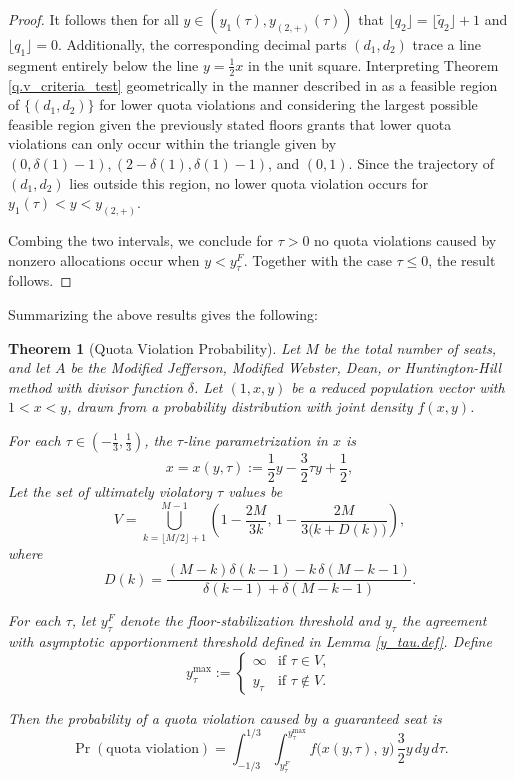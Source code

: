 \documentclass[11pt]{article}
\newtheorem{theorem}{Theorem}[section]
\theoremstyle{definition}
\theoremstyle{definition}
\begin{document}
\begin{proof}
It follows then for all $y \in (y_1(\tau), y_{(2,+)}(\tau))$ that $\lfloor q_2 \rfloor =\lfloor \tilde q_2 \rfloor + 1$ and $\lfloor q_1 \rfloor = 0$. Additionally, the corresponding decimal parts $(d_1, d_2)$ trace a line segment entirely below the line $y = \frac{1}{2} x$ in the unit square. Interpreting Theorem \ref{q.v_criteria_test} geometrically in the manner described in \parencite{Self} as a feasible region of $\{(d_1, d_2)\}$ for lower quota violations and considering the largest possible feasible region given the previously stated floors grants that lower quota violations can only occur within the triangle given by $(0, \delta(1)-1), (2-\delta(1), \delta(1)-1)$, and $(0,1)$. Since the trajectory of $(d_1,d_2)$ lies outside this region, no lower quota violation occurs for $y_1(\tau) < y < y_{(2,+)}.$ 

Combing the two intervals, we conclude for $\tau > 0$ no quota violations caused by nonzero allocations occur when $y < y_\tau^F$. Together with the case $\tau \leq 0$, the result follows. 
\end{proof}


Summarizing the above results gives the following:

\begin{theorem}[Quota Violation Probability]\label{kitchen_sink}
Let $M$ be the total number of seats, and let $A$ be the Modified Jefferson, Modified Webster, Dean, or Huntington-Hill method with divisor function $\delta$. Let $(1,x,y)$ be a reduced population vector with $1 < x < y$, drawn from a probability distribution with joint density $f(x,y)$.

For each $\tau \in \left(-\frac{1}{3},\frac{1}{3}\right)$, the $\tau$-line parametrization in $x$ is 
$$
x = x(y,\tau) := \frac{1}{2}y - \frac{3}{2}\tau y + \frac{1}{2},
$$
Let the set of ultimately violatory $\tau$ values be
$$
V = \bigcup_{k= \lfloor M/2 \rfloor + 1}^{M-1} 
\left( 1 - \frac{2M}{3k}, \, 1 - \frac{2M}{3\bigl(k + D(k)\bigr)} \right),
$$
where
$$
D(k) =\frac{(M-k)\delta(k-1)-k\,\delta(M-k-1)}{\delta(k-1)+\delta(M-k-1)}.
$$

For each $\tau$, let $y^F_\tau$ denote the floor-stabilization threshold and $y_\tau$ the agreement with asymptotic apportionment threshold defined in Lemma \ref{y_tau.def}. Define
$$
y_\tau^{\max} :=
\begin{cases}
\infty & \text{if } \tau \in V,\\
y_\tau & \text{if } \tau \notin V.
\end{cases}
$$

Then the probability of a quota violation caused by a guaranteed seat is
$$
\Pr(\text{quota violation})
=
\int_{-1/3}^{1/3}
\int_{y_\tau^F}^{y_\tau^{\max}}
f\bigl(x(y,\tau),\,y\bigr)\,
\frac{3}{2}y
\, dy \, d\tau.
$$
\end{theorem}
\end{document}
